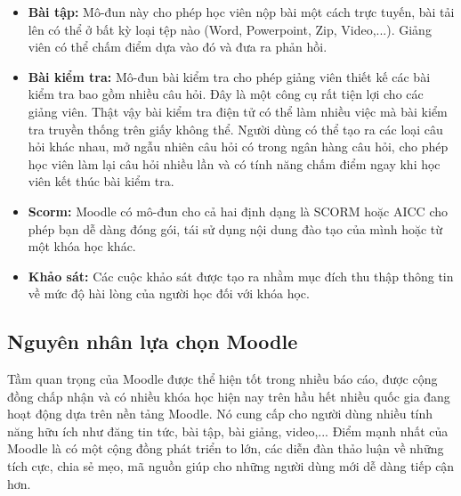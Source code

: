 \begin{itemize}
	\item {\bf Bài tập:} Mô-đun này cho phép học viên nộp bài một cách trực tuyến, bài tải lên có thể ở bất kỳ loại tệp nào (Word, Powerpoint, Zip, Video,...). Giảng viên có thể chấm điểm dựa vào đó và đưa ra phản hồi.
	\item {\bf Bài kiểm tra:} Mô-đun bài kiểm tra cho phép giảng viên thiết kế các bài kiểm tra bao gồm nhiều câu hỏi. Đây là một công cụ rất tiện lợi cho các giảng viên. Thật vậy bài kiểm tra điện tử có thể làm nhiều việc mà bài kiểm tra truyền thống trên giấy không thể. Người dùng có thể tạo ra các loại câu hỏi khác nhau, mở ngẫu nhiên câu hỏi có trong ngân hàng câu hỏi, cho phép học viên làm lại câu hỏi nhiều lần và có tính năng chấm điểm ngay khi học viên kết thúc bài kiểm tra.
	\item {\bf Scorm:} Moodle có mô-đun cho cả hai định dạng là SCORM hoặc AICC cho phép bạn dễ dàng đóng gói, tái sử dụng nội dung đào tạo của mình hoặc từ một khóa học khác.
	\item {\bf Khảo sát:} Các cuộc khảo sát được tạo ra nhằm mục đích thu thập thông tin về mức độ hài lòng của người học đối với khóa học. 
	
\end{itemize}

\subsection{Nguyên nhân lựa chọn Moodle}
Tầm quan trọng của Moodle được thể hiện tốt trong nhiều báo cáo, được cộng đồng chấp nhận và có nhiều khóa học hiện nay trên hầu hết nhiều quốc gia đang hoạt động dựa trên nền tảng Moodle. Nó cung cấp cho người dùng nhiều tính năng hữu ích như đăng tin tức, bài tập, bài giảng, video,... Điểm mạnh nhất của Moodle là có một cộng đồng phát triển to lớn, các diễn đàn thảo luận về những tích cực, chia sẻ mẹo, mã nguồn giúp cho những người dùng mới dễ dàng tiếp cận hơn.

